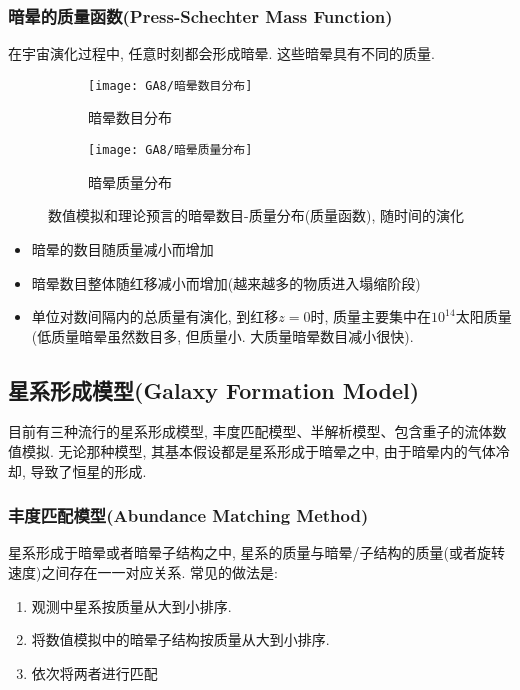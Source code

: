 \subsubsection{暗晕的质量函数(Press-Schechter Mass Function)}
在宇宙演化过程中, 任意时刻都会形成暗晕. 这些暗晕具有不同的质量. 
\begin{figure}[!htb]
    \centering
    \begin{subfigure}{0.22\textwidth}
        \centering
        \texttt{[image: GA8/暗晕数目分布]}
        \caption{暗晕数目分布}
    \end{subfigure}
    \begin{subfigure}{0.22\textwidth}
        \centering
        \texttt{[image: GA8/暗晕质量分布]}
        \caption{暗晕质量分布}
    \end{subfigure}
    \caption{\small 数值模拟和理论预言的暗晕数目-质量分布(质量函数), 随时间的演化}
\end{figure}
\begin{itemize}\small 
    \item 暗晕的数目随质量减小而增加
    \item 暗晕数目整体随红移减小而增加(越来越多的物质进入塌缩阶段)
    \item 单位对数间隔内的总质量有演化, 到红移$z=0$时, 质量主要集中在$10^{14}$太阳质量(低质量暗晕虽然数目多, 但质量小. 大质量暗晕数目减小很快). 
\end{itemize}

\subsection{星系形成模型(Galaxy Formation Model)}
目前有三种流行的星系形成模型, 丰度匹配模型、半解析模型、包含重子的流体数值模拟. 无论那种模型, 其基本假设都是星系形成于暗晕之中, 由于暗晕内的气体冷却, 导致了恒星的形成. 
\subsubsection{丰度匹配模型(Abundance Matching Method)}
星系形成于暗晕或者暗晕子结构之中, 星系的质量与暗晕/子结构的质量(或者旋转速度)之间存在一一对应关系. 常见的做法是:
\begin{enumerate}
    \item 观测中星系按质量从大到小排序. 
    \item 将数值模拟中的暗晕子结构按质量从大到小排序. 
    \item 依次将两者进行匹配
\end{enumerate}

